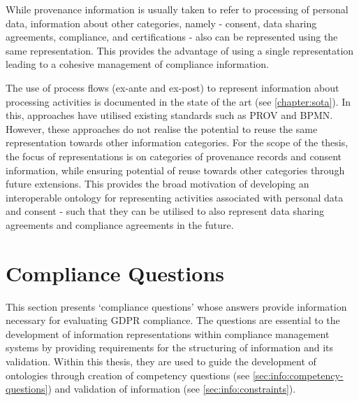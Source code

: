 While provenance information is usually taken to refer to processing of personal data, information about other categories, namely - consent, data sharing agreements, compliance, and certifications - also can be represented using the same representation. This provides the advantage of using a single representation leading to a cohesive management of compliance information.

The use of process flows (ex-ante and ex-post) to represent information about processing activities is documented in the state of the art (see \autoref{chapter:sota}). In this, approaches have utilised existing standards such as PROV and BPMN. However, these approaches do not realise the potential to reuse the same representation towards other information categories.
For the scope of the thesis, the focus of representations is on categories of provenance records and consent information, while ensuring potential of reuse towards other categories through future extensions. This provides the broad motivation of developing an interoperable ontology for representing activities associated with personal data and consent - such that they can be utilised to also represent data sharing agreements and compliance agreements in the future.

\section{Compliance Questions}\label{sec:info:compliance-questions}
This section presents `compliance questions' whose answers provide information necessary for evaluating GDPR compliance. The questions are essential to the development of information representations within compliance management systems by providing requirements for the structuring of information and its validation. Within this thesis, they are used to guide the development of ontologies through creation of competency questions (see \autoref{sec:info:competency-questions}) and validation of information (see \autoref{sec:info:constraints}).

